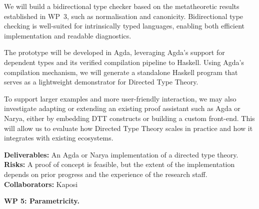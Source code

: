 \documentclass[a4paper,11pt]{article}
\renewcommand{\paragraph}[1]{\textbf{#1.}}
\begin{document}
We will build a bidirectional type checker based on the metatheoretic
results established in WP~3, such as normalisation and
canonicity. Bidirectional type checking is well-suited for
intrinsically typed languages, enabling both efficient implementation
and readable diagnostics.

The prototype will be developed in Agda, leveraging Agda’s support for
dependent types and its verified compilation pipeline to
Haskell. Using Agda's compilation mechanism, we will generate a
standalone Haskell program that serves as a lightweight demonstrator
for Directed Type Theory.

To support larger examples and more user-friendly interaction, we may
also investigate adapting or extending an existing proof assistant
such as Agda or Narya, either by embedding DTT constructs or building
a custom front-end. This will allow us to evaluate how Directed Type
Theory scales in practice and how it integrates with existing
ecosystems.

\textbf{Deliverables:} An Agda or Narya implementation of a directed type theory.
\\
\textbf{Risks:} A proof of concept is feasible, but the extent of the
implementation depends on prior progress and the experience of the
research staff.
\\
\textbf{Collaborators:} Kaposi




\paragraph{WP 5: Parametricity}
\end{document}

